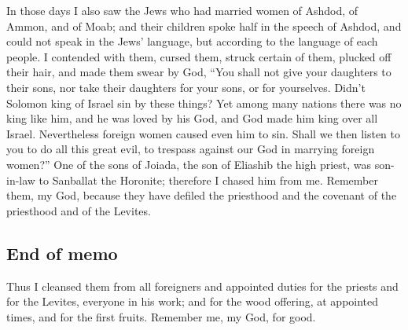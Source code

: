  In those days I also saw the Jews who had married women
of Ashdod, of Ammon, and of Moab;  and their children
spoke half in the speech of Ashdod, and could not speak in the Jews'
language, but according to the language of each people. 
I contended with them, cursed them, struck certain of them, plucked off
their hair, and made them swear by God, ``You shall not give your
daughters to their sons, nor take their daughters for your sons, or for
yourselves.  Didn't Solomon king of Israel sin by these
things? Yet among many nations there was no king like him, and he was
loved by his God, and God made him king over all Israel. Nevertheless
foreign women caused even him to sin.  Shall we then
listen to you to do all this great evil, to trespass against our God in
marrying foreign women?''  One of the sons of Joiada, the
son of Eliashib the high priest, was son-in-law to Sanballat the
Horonite; therefore I chased him from me.  Remember them,
my God, because they have defiled the priesthood and the covenant of the
priesthood and of the Levites.

\hypertarget{end-of-memo}{%
\subsection{End of memo}\label{end-of-memo}}

 Thus I cleansed them from all foreigners and appointed
duties for the priests and for the Levites, everyone in his work;
 and for the wood offering, at appointed times, and for
the first fruits. Remember me, my God, for good.
